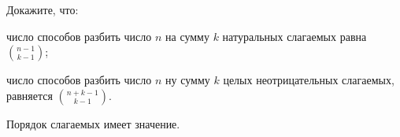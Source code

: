 Докажите, что:
\begin{enumcyr}
    \item число способов разбить число $n$ на сумму $k$ натуральных слагаемых равна $\binom{n - 1}{k - 1}$;
    \item число способов разбить число $n$ ну сумму $k$ целых неотрицательных слагаемых, равняется $\binom{n + k - 1}{k - 1}$. 
\end{enumcyr}

Порядок слагаемых имеет значение.